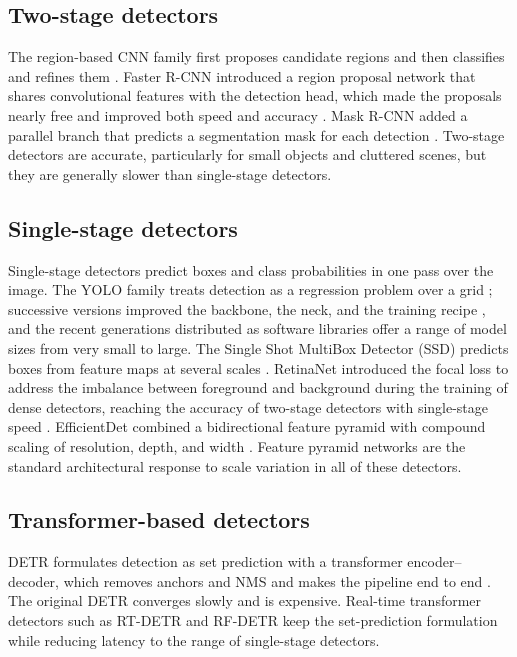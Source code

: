 \subsection{Two-stage detectors}
The region-based CNN family first proposes candidate regions and then classifies and refines them \cite{girshick2014rcnn}. Faster R-CNN introduced a region proposal network that shares convolutional features with the detection head, which made the proposals nearly free and improved both speed and accuracy \cite{ren2017fasterrcnn}. Mask R-CNN added a parallel branch that predicts a segmentation mask for each detection \cite{he2017maskrcnn}. Two-stage detectors are accurate, particularly for small objects and cluttered scenes, but they are generally slower than single-stage detectors.

\subsection{Single-stage detectors}
Single-stage detectors predict boxes and class probabilities in one pass over the image. The YOLO family treats detection as a regression problem over a grid \cite{redmon2016yolo}; successive versions improved the backbone, the neck, and the training recipe \cite{redmon2018yolov3,bochkovskiy2020yolov4}, and the recent generations distributed as software libraries offer a range of model sizes from very small to large. The Single Shot MultiBox Detector (SSD) predicts boxes from feature maps at several scales \cite{liu2016ssd}. RetinaNet introduced the focal loss to address the imbalance between foreground and background during the training of dense detectors, reaching the accuracy of two-stage detectors with single-stage speed \cite{lin2017focal}. EfficientDet combined a bidirectional feature pyramid with compound scaling of resolution, depth, and width \cite{tan2020efficientdet}. Feature pyramid networks \cite{lin2017fpn} are the standard architectural response to scale variation in all of these detectors.

\subsection{Transformer-based detectors}
DETR formulates detection as set prediction with a transformer encoder--decoder, which removes anchors and NMS and makes the pipeline end to end \cite{carion2020detr}. The original DETR converges slowly and is expensive. Real-time transformer detectors such as RT-DETR \cite{zhao2024rtdetr} and RF-DETR \cite{robinson2025rfdetr} keep the set-prediction formulation while reducing latency to the range of single-stage detectors.


